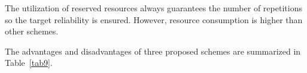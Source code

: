 \documentclass{ieeeaccess}
\begin{document}
The utilization of reserved resources always guarantees the number of repetitions so the target reliability is ensured. However, resource consumption is higher than other schemes.

The advantages and disadvantages of three proposed schemes are summarized in Table~\ref{tab9}.


\end{document}
